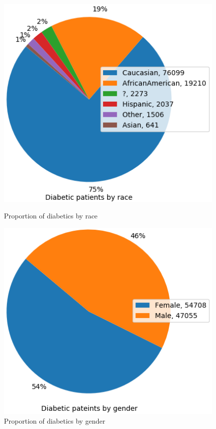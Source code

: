 \documentclass[11pt]{report}
\begin{document}
\begin{figure}[ht]
	\begin{minipage}[b]{.5\textwidth}
	\centering
	\includegraphics[width=1\textwidth]{race_pie.png}
	\caption{Proportion of diabetics by race}
	\end{minipage}
	\hfill
	\begin{minipage}[b]{.5\textwidth}
	\centering
	\includegraphics[width=1\textwidth]{gender_pie.png}
\caption{Proportion of diabetics by gender}
\end{minipage}
\end{figure}
\end{document}
